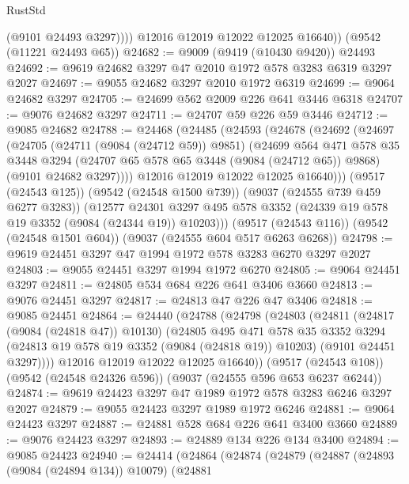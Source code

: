 \begin{lexlean}{RustStd}
\begin{coremodule}
              (@9101 @24493 @3297))))
        @12016
        @12019
        @12022
        @12025
        @16640))
    (@9542 (@11221 @24493 @65))
@24682 := @9009 (@9419 (@10430 @9420)) @24493
@24692 := @9619 @24682 @3297 @47 @2010 @1972 @578 @3283 @6319 @3297 @2027
@24697 := @9055 @24682 @3297 @2010 @1972 @6319
@24699 := @9064 @24682 @3297
@24705 := @24699 @562 @2009 @226 @641 @3446 @6318
@24707 := @9076 @24682 @3297
@24711 := @24707 @59 @226 @59 @3446
@24712 := @9085 @24682
@24788 := @24468
    (@24485
      (@24593
        (@24678
          (@24692
            (@24697
              (@24705
                (@24711 (@9084 (@24712 @59)) @9851)
                (@24699
                  @564
                  @471
                  @578
                  @35
                  @3448
                  @3294
                  (@24707 @65 @578 @65 @3448 (@9084 (@24712 @65)) @9868)
                  (@9101 @24682 @3297))))
            @12016
            @12019
            @12022
            @12025
            @16640)))
      (@9517 (@24543 @125))
      (@9542 (@24548 @1500 @739))
      (@9037 (@24555 @739 @459 @6277 @3283))
      (@12577 @24301 @3297 @495 @578 @3352 (@24339 @19 @578 @19 @3352 (@9084 (@24344 @19)) @10203)))
    (@9517 (@24543 @116))
    (@9542 (@24548 @1501 @604))
    (@9037 (@24555 @604 @517 @6263 @6268))
@24798 := @9619 @24451 @3297 @47 @1994 @1972 @578 @3283 @6270 @3297 @2027
@24803 := @9055 @24451 @3297 @1994 @1972 @6270
@24805 := @9064 @24451 @3297
@24811 := @24805 @534 @684 @226 @641 @3406 @3660
@24813 := @9076 @24451 @3297
@24817 := @24813 @47 @226 @47 @3406
@24818 := @9085 @24451
@24864 := @24440
    (@24788
      (@24798
        (@24803
          (@24811
            (@24817 (@9084 (@24818 @47)) @10130)
            (@24805
              @495
              @471
              @578
              @35
              @3352
              @3294
              (@24813 @19 @578 @19 @3352 (@9084 (@24818 @19)) @10203)
              (@9101 @24451 @3297))))
        @12016
        @12019
        @12022
        @12025
        @16640))
    (@9517 (@24543 @108))
    (@9542 (@24548 @24326 @596))
    (@9037 (@24555 @596 @653 @6237 @6244))
@24874 := @9619 @24423 @3297 @47 @1989 @1972 @578 @3283 @6246 @3297 @2027
@24879 := @9055 @24423 @3297 @1989 @1972 @6246
@24881 := @9064 @24423 @3297
@24887 := @24881 @528 @684 @226 @641 @3400 @3660
@24889 := @9076 @24423 @3297
@24893 := @24889 @134 @226 @134 @3400
@24894 := @9085 @24423
@24940 := @24414
    (@24864
      (@24874
        (@24879
          (@24887
            (@24893 (@9084 (@24894 @134)) @10079)
            (@24881

\end{coremodule}
\end{lexlean}
